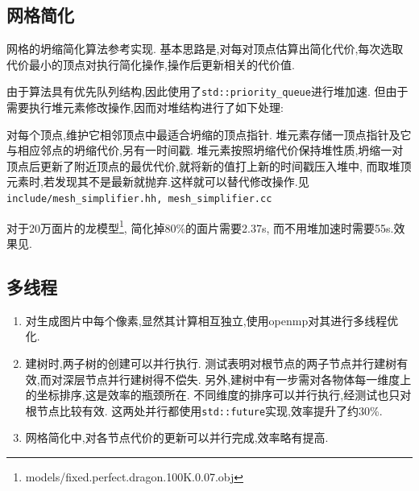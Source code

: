 \subsection{网格简化}
网格的坍缩简化算法参考\cite{mesh}实现.
基本思路是,对每对顶点估算出简化代价,每次选取代价最小的顶点对执行简化操作,操作后更新相关的代价值.

由于算法具有优先队列结构,因此使用了\verb|std::priority_queue|进行堆加速.
但由于需要执行堆元素修改操作,因而对堆结构进行了如下处理:

对每个顶点,维护它相邻顶点中最适合坍缩的顶点指针.
堆元素存储一顶点指针及它与相应邻点的坍缩代价,另有一时间戳.
堆元素按照坍缩代价保持堆性质,坍缩一对顶点后更新了附近顶点的最优代价,就将新的值打上新的时间戳压入堆中,
而取堆顶元素时,若发现其不是最新就抛弃.这样就可以替代修改操作.见\verb|include/mesh_simplifier.hh, mesh_simplifier.cc|

对于20万面片的龙模型\footnote{models/fixed.perfect.dragon.100K.0.07.obj},
简化掉80\%的面片需要2.37s, 而不用堆加速时需要55s.效果见.

\subsection{多线程}
\begin{enumerate}
  \item 对生成图片中每个像素,显然其计算相互独立,使用openmp对其进行多线程优化.

  \item 建树时,两子树的创建可以并行执行.
    测试表明对根节点的两子节点并行建树有效,而对深层节点并行建树得不偿失.
    另外,建树中有一步需对各物体每一维度上的坐标排序,这是效率的瓶颈所在.
    不同维度的排序可以并行执行,经测试也只对根节点比较有效.
    这两处并行都使用\verb|std::future|实现,效率提升了约30\%.

  \item 网格简化中,对各节点代价的更新可以并行完成,效率略有提高.
\end{enumerate}
